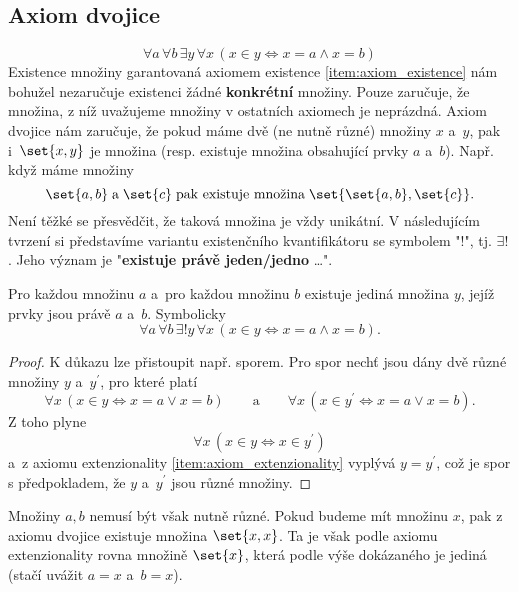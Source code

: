 \subsection{Axiom dvojice}
\begin{equation*}
    \forall a\,\forall b\,\exists y\,\forall x\,(x \in y \iff x=a \land x=b)
\end{equation*}
Existence množiny garantovaná axiomem existence \ref{item:axiom_existence} nám bohužel nezaručuje existenci žádné \textbf{konkrétní} množiny. Pouze zaručuje, že množina, z níž uvažujeme množiny v ostatních axiomech je neprázdná. Axiom dvojice nám zaručuje, že pokud máme dvě (ne nutně různé) množiny $x$ a~$y$, pak i~$\set{x,y}$ je množina (resp. existuje množina obsahující prvky $a$ a~$b$). Např. když máme množiny
\begin{equation*}
    \set{a,b}\;\text{a}\;\set{c}\;\text{pak existuje množina}\;\set{\set{a,b},\set{c}}.
\end{equation*}
Není těžké se přesvědčit, že taková množina je vždy unikátní. V následujícím tvrzení si představíme variantu existenčního kvantifikátoru se symbolem "$!$", tj. $\exists!$. Jeho význam je "\textbf{existuje právě jeden/jedno} \dots".
\begin{lemma}\label{lem:univerzalnost_neusp_dvojic}
    Pro každou množinu $a$ a~pro každou množinu $b$ existuje jediná množina $y$, jejíž prvky jsou právě $a$ a~$b$. Symbolicky
    \begin{equation*}
        \forall a\,\forall b\,\exists!y\,\forall x\,(x \in y \iff x=a \land x=b).
    \end{equation*}
\end{lemma}
\begin{proof}
    K důkazu lze přistoupit např. sporem. Pro spor nechť jsou dány dvě různé množiny $y$ a~$y^\prime$, pro které platí
    \begin{equation*}
        \forall x\,(x\in y \iff x=a \lor x=b)\qquad \text{a}\qquad\forall x\, (x\in y^\prime \iff x=a \lor x=b).
    \end{equation*}
    Z toho plyne
    \begin{equation*}
        \forall x\,(x\in y \iff x\in y^\prime)
    \end{equation*}
    a~z axiomu extenzionality \ref{item:axiom_extenzionality} vyplývá $y=y^\prime$, což je spor s předpokladem, že $y$ a~$y^\prime$ jsou různé množiny.
\end{proof}
Množiny $a,b$ nemusí být však nutně různé. Pokud budeme mít množinu $x$, pak z axiomu dvojice existuje množina $\set{x,x}$. Ta je však podle axiomu extenzionality rovna množině $\set{x}$, která podle výše dokázaného je jediná (stačí uvážit $a=x$ a~$b=x$).
